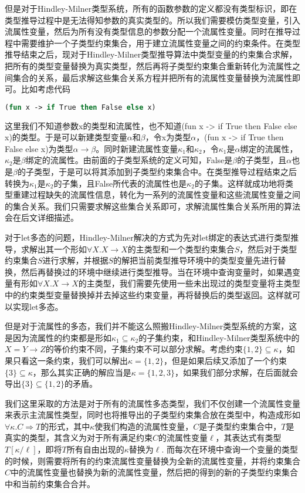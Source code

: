 \documentclass[UTF8, colorlinks]{pkuthss}
\begin{document}
	但是对于Hindley-Milner类型系统，所有的函数参数的定义都没有类型标识，即在类型推导过程中是无法得知参数的真实类型的。所以我们需要模仿类型变量，引入流属性变量，然后为所有没有类型信息的参数分配一个流属性变量。同时在推导过程中需要维护一个子类型约束集合，用于建立流属性变量之间的约束条件。在类型推导结束之后，现对于Hindley-Milner类型推导算法中类型变量的约束集合求解，把所有的类型变量替换为真实类型，然后再将子类型约束集合重新转化为流属性之间集合的关系，最后求解这些集合关系方程并把所有的流属性变量替换为流属性即可。比如考虑代码
	\begin{lstlisting}[language=Ocaml]
		(fun x -> if True then False else x)
	\end{lstlisting}
	这里我们不知道参数x的类型和流属性，也不知道(fun x -> if True then False else x)的类型。于是可以新建类型变量$\alpha$和$\beta$，令x为类型$\alpha$，(fun x -> if True then False else x)为类型$\alpha\to\beta$。同时新建流属性变量$\kappa_1$和$\kappa_2$，令$\kappa_1$是$\alpha$绑定的流属性，$\kappa_2$是$\beta$绑定的流属性。由前面的子类型系统的定义可知，False是$\beta$的子类型，且$\alpha$也是$\beta$的子类型，于是可以将其添加到子类型约束集合中。在类型推导过程结束之后转换为$\kappa_1$是$\kappa_2$的子集，且False所代表的流属性也是$\kappa_2$的子集。这样就成功地将类型重建过程缺失的流属性信息，转化为一系列的流属性变量和这些流属性变量之间的集合关系。我们只需要求解这些集合关系即可，求解流属性集合关系所用的算法会在后文详细描述。
	
	对于let多态的问题，Hindley-Milner解决的方式为先对let绑定的表达式进行类型推导，求解出其一个形如$\forall X.X\to X$的主类型和一个类型约束集合$S$，然后对于类型约束集合$S$进行求解，并根据$S$的解把当前类型推导环境中的类型变量先进行替换，然后再替换过的环境中继续进行类型推导。当在环境中查询变量时，如果遇变量有形如$\forall X.X\to X$的主类型，我们需要先使用一些未出现过的类型变量将主类型中的约束类型变量替换掉并去掉这些约束变量，再将替换后的类型返回。这样就可以实现let多态。
	
	但是对于流属性的多态，我们并不能这么照搬Hindley-Milner类型系统的方案，这是因为流属性的约束都是形如$\kappa_1\subseteq \kappa_2$的子集约束，和Hindley-Milner类型系统中的$X = Y\to Z$的等价约束不同，子集约束不可以部分求解。考虑约束$\{1, 2\}\subseteq \kappa$，如果只看这一条约束，我们可以解出$\kappa = \{1, 2\}$，但是如果后续又添加了一个约束$\{3\} \subseteq \kappa$，那么其实正确的解应当是$\kappa = \{1, 2, 3\}$，如果我们部分求解，在后面就会导出$\{3\} \subseteq \{1, 2\}$的矛盾。
	
	我们这里采取的方法是对于所有的流属性多态类型，我们不仅创建一个流属性变量来表示主流属性类型，同时也将推导出的子类型约束集合放在类型中，构造成形如$\forall\kappa. C\Rightarrow T$的形式，其中$\kappa$使我们构造的流属性变量，$C$是子类型约束集合中，$T$是真实的类型，其含义为对于所有满足约束$C$的流属性变量$\ell$，其表达式有类型$T[\kappa/\ell]$，即将$T$所有自由出现的$\kappa$替换为$\ell$. 而每次在环境中查询一个变量的类型的时候，则需要将所有的约束流属性变量替换为全新的流属性变量，并将约束集合$C$中的流属性变量也替换为新的流属性变量，然后把的得到的新的子类型约束集合中和当前约束集合合并。
	
\end{document}
